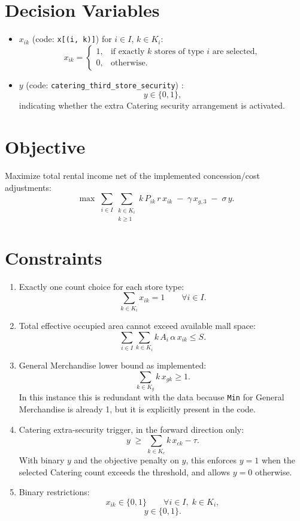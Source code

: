\section*{Decision Variables}

\begin{itemize}
    \item $x_{ik}$ (code: \texttt{x[(i, k)]}) for $i \in I$, $k \in K_i$:
    \[
    x_{ik}=
    \begin{cases}
    1, & \text{if exactly }k\text{ stores of type }i\text{ are selected},\\
    0, & \text{otherwise.}
    \end{cases}
    \]
    \item $y$ (code: \texttt{catering\_third\_store\_security}) :
    \[
    y \in \{0,1\},
    \]
    indicating whether the extra Catering security arrangement is activated.
\end{itemize}

\section*{Objective}

Maximize total rental income net of the implemented concession/cost adjustments:
\[
\max \;
\sum_{i \in I}\sum_{\substack{k \in K_i\\k \ge 1}} k\,P_{ik}\,r\,x_{ik}
\;-\;
\gamma\,x_{g,3}
\;-\;
\sigma\,y.
\]

\section*{Constraints}

\begin{enumerate}
    \item Exactly one count choice for each store type:
    \[
    \sum_{k \in K_i} x_{ik} = 1
    \qquad \forall i \in I.
    \]

    \item Total effective occupied area cannot exceed available mall space:
    \[
    \sum_{i \in I}\sum_{k \in K_i} k\,A_i\,\alpha\,x_{ik} \le S.
    \]

    \item General Merchandise lower bound as implemented:
    \[
    \sum_{k \in K_g} k\,x_{gk} \ge 1.
    \]
    In this instance this is redundant with the data because \texttt{Min} for General Merchandise is already 1, but it is explicitly present in the code.

    \item Catering extra-security trigger, in the forward direction only:
    \[
    y \;\ge\; \sum_{k \in K_c} k\,x_{ck} - \tau.
    \]
    With binary $y$ and the objective penalty on $y$, this enforces $y=1$ when the selected Catering count exceeds the threshold, and allows $y=0$ otherwise.

    \item Binary restrictions:
    \[
    x_{ik} \in \{0,1\}
    \qquad \forall i \in I,\; k \in K_i,
    \]
    \[
    y \in \{0,1\}.
    \]
\end{enumerate}

